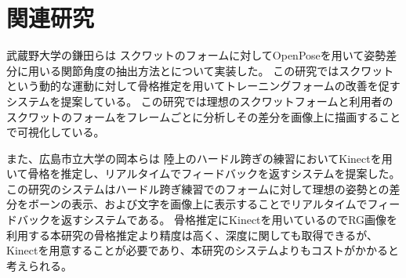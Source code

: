 \chapter{関連研究}
\label{related_reserch}

武蔵野大学の鎌田らは \cite{Relatedresearch1}スクワットのフォームに対してOpenPoseを用いて姿勢差分に用いる関節角度の抽出方法とについて実装した。
この研究ではスクワットという動的な運動に対して骨格推定を用いてトレーニングフォームの改善を促すシステムを提案している。
この研究では理想のスクワットフォームと利用者のスクワットのフォームをフレームごとに分析しその差分を画像上に描画することで可視化している。

また、広島市立大学の岡本らは \cite{Relatedresearch2}陸上のハードル跨ぎの練習においてKinectを用いて骨格を推定し、リアルタイムでフィードバックを返すシステムを提案した。
この研究のシステムはハードル跨ぎ練習でのフォームに対して理想の姿勢との差分をボーンの表示、および文字を画像上に表示することでリアルタイムでフィードバックを返すシステムである。
骨格推定にKinectを用いているのでRG画像を利用する本研究の骨格推定より精度は高く、深度に関しても取得できるが、Kinectを用意することが必要であり、本研究のシステムよりもコストがかかると考えられる。
